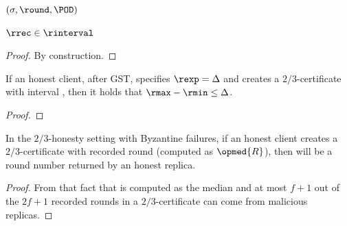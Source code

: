 \begin{algorithm}
    \caption{Code for a replica}
    \label{alg:constr1-replica}
    \begin{algorithmic}[1]
            \If{$\rexp < \round$}
                \return
            \EndIf
            \Statex{}
        \EndFunction
        \Statex
            \Let{\sigma}{\opsign{$(\round, \POD)$}} 
            \return $(\sigma, \round, \POD)$~\label{line:respond-read}
        \EndFunction
    \end{algorithmic}
    \end{algorithm}


\begin{lemma}
    $\rrec \in \rinterval$
\end{lemma}
\begin{proof}
    By construction.
\end{proof}

\begin{lemma}
    If an honest client, after GST, specifies $\rexp = \Delta$ and creates a $2/3$-certificate with interval \rinterval, then it holds that $\rmax - \rmin \leq \Delta$.
\end{lemma}


\begin{proof}
\end{proof}


\begin{lemma}
    In the $2/3$-honesty setting with Byzantine failures,
    if an honest client creates a $2/3$-certificate with recorded round \rrec (computed as $\opmed{R}$),
    then \rrec will be a round number returned by an honest replica.
\end{lemma}
\begin{proof}
    From that fact that \rrec is computed as the median and at most $f+1$ out of the $2f+1$ recorded
    rounds in a $2/3$-certificate can come from malicious replicas.
\end{proof}


